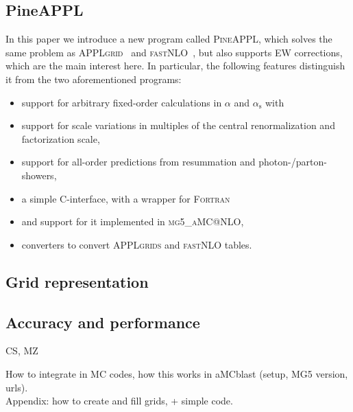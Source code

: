\subsection{PineAPPL}
\label{sec:pineappl}

In this paper we introduce a new program called \textsc{PineAPPL}, which solves the same problem as \textsc{APPLgrid}~\cite{} and \textsc{fastNLO}~\cite{}, but also supports EW corrections, which are the main interest here.
In particular, the following features distinguish it from the two aforementioned programs:
\begin{itemize}
\item support for arbitrary fixed-order calculations in $\alpha$ and $\alpha_\mathrm{s}$ with
\item support for scale variations in multiples of the central renormalization and factorization scale,
\item support for all-order predictions from resummation and photon-/parton-showers,
\item a simple \textsc{C}-interface, with a wrapper for \textsc{Fortran}
\item and support for it implemented in \textsc{mg5\_aMC@NLO},
\item converters to convert \textsc{APPLgrids} and \textsc{fastNLO} tables.
\end{itemize}

\subsection{Grid representation}
\label{sec:grid-representation}

\subsection{Accuracy and performance}
\label{sec:accuracy-and-performance}

CS, MZ

How to integrate in MC codes, how this works in aMCblast (setup, MG5 version, urls).\\
Appendix: how to create and fill grids, + simple code.
